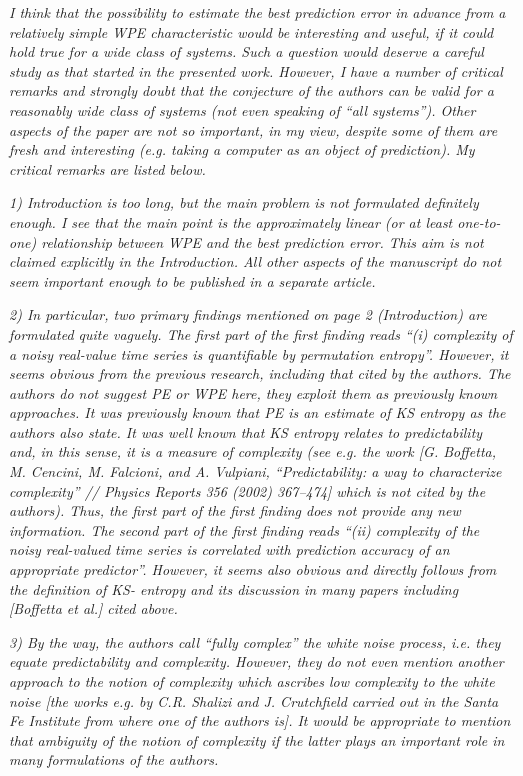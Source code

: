 \documentclass[12pt]{article}
\begin{document}
\emph{I think that the possibility to estimate the best prediction error in
advance from a relatively simple WPE characteristic would be interesting and
useful, if it could hold true for a wide class of systems. Such a question would
deserve a careful study as that started in the presented work. However, I have a
number of critical remarks and strongly doubt that the conjecture of the authors
can be valid for a reasonably wide class of systems (not even speaking of ``all
systems''). Other aspects of the paper are not so important, in my view, despite
some of them are fresh and interesting (e.g. taking a computer as an object of
prediction). My critical remarks are listed below.}

\emph{1) Introduction is too long, but the main problem is not formulated
definitely enough. I see that the main point is the approximately linear (or at
least one-to-one) relationship between WPE and the best prediction error. This
aim is not claimed explicitly in the Introduction. All other aspects of the
manuscript do not seem important enough to be published in a separate article.}

\emph{2) In particular, two primary findings mentioned on page 2 (Introduction)
are formulated quite vaguely. The first part of the first finding reads ``(i)
complexity of a noisy real-value time series is quantifiable by permutation
entropy''. However, it seems obvious from the previous research, including that
cited by the authors. The authors do not suggest PE or WPE here, they exploit
them as previously known approaches. It was previously known that PE is an
estimate of KS entropy as the authors also state. It was well known that KS
entropy relates to predictability and, in this sense, it is a measure of
complexity (see e.g. the work [G. Boffetta, M. Cencini, M. Falcioni, and A.
Vulpiani, ``Predictability: a way to characterize complexity'' // Physics
Reports 356 (2002) 367–474] which is not cited by the authors). Thus, the first
part of the first finding does not provide any new information. The second part
of the first finding reads ``(ii) complexity of the noisy real-valued time
series is correlated with prediction accuracy of an appropriate predictor''.
However, it seems also obvious and directly follows from the definition of KS-
entropy and its discussion in many papers including [Boffetta et al.] cited
above.}

\emph{3) By the way, the authors call ``fully complex'' the white noise process,
i.e. they equate predictability and complexity. However, they do not even
mention another approach to the notion of complexity which ascribes low
complexity to the white noise [the works e.g. by C.R. Shalizi and J. Crutchfield
carried out in the Santa Fe Institute from where one of the authors is]. It
would be appropriate to mention that ambiguity of the notion of complexity if
the latter plays an important role in many formulations of the authors.}
\end{document}

